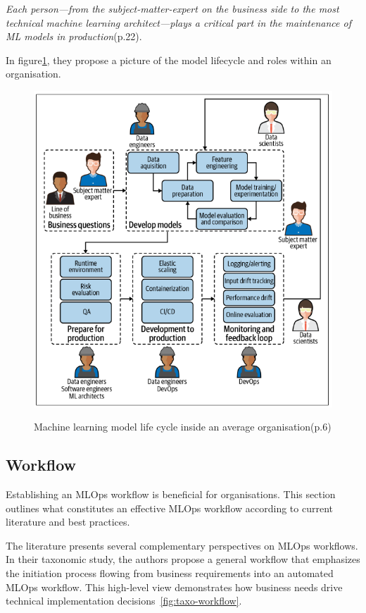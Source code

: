 \textit{Each person—from the subject-matter-expert on the business side to the most
technical machine learning architect—plays a critical part in the maintenance of ML
models in production}\cite{treveil2020introducing}(p.22).

In figure\ref{fig:mlop-people}, they propose a picture of the model lifecycle and roles within an organisation.
\begin{figure}[!htbp]
    \caption{Machine learning model life cycle inside an average
    organisation\cite{treveil2020introducing}(p.6)}
    \centering
    \includegraphics[scale=0.3]{images/mlops-people}
    \label{fig:mlop-people}
\end{figure}

\subsection{Workflow}\label{subsec:workflow}

Establishing an MLOps workflow is beneficial for organisations.
This section outlines what constitutes an effective MLOps workflow according to current literature and best practices.

The literature presents several complementary perspectives on MLOps workflows\cite{treveil2020introducing,gift2021practical,Kreuzberger2022MachineLO}.
In their taxonomic study\cite{9792270}, the authors propose a general workflow that emphasizes the initiation process flowing from business requirements into an automated MLOps workflow.
This high-level view demonstrates how business needs drive technical implementation decisions~\ref{fig:taxo-workflow}.

